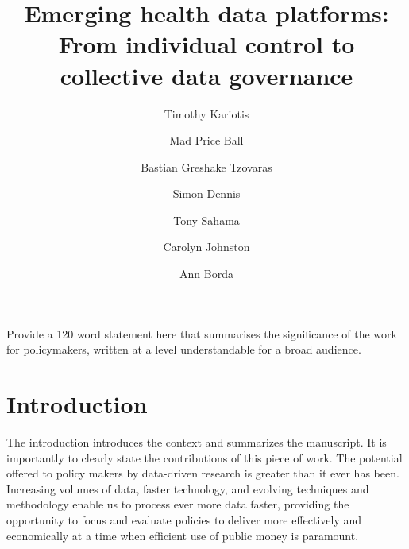 \documentclass{CUP-JNL-DAP}%
\begin{document}
\begin{Frontmatter}

\title[Emerging health data platforms]{Emerging health data platforms: From individual control
to collective data governance}

\author*[1]{Timothy Kariotis}
\author[2]{Mad Price Ball}
\author[3]{Bastian Greshake Tzovaras}
\author[1]{Simon Dennis}
\author[2]{Tony Sahama}
\author[3]{Carolyn Johnston}
\author[1]{Ann Borda}


\address*[1]{, , }
\address[2]{, , }
\address[3]{, , }






\begin{policy}
Provide a 120 word statement here that summarises the significance of the work for policymakers, written at a level understandable for a broad audience.
\end{policy}

\end{Frontmatter}


\section{Introduction}

The introduction introduces the context and summarizes the manuscript. It is importantly to clearly state the contributions of this piece of work. The potential offered to policy makers by data-driven research is greater than it ever has been. Increasing volumes of data, faster technology, and evolving techniques and methodology enable us to process ever more data faster, providing the opportunity to focus and evaluate policies to deliver more effectively and economically at a time when efficient use of public money is paramount.
\end{document}
